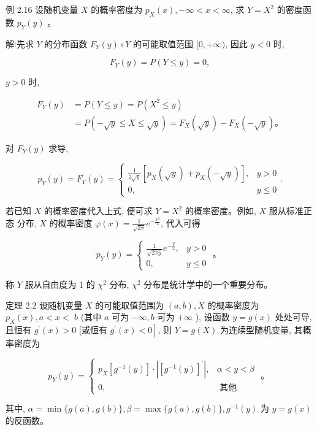 \documentclass{beamer}
\begin{document}
	\begin{frame}
		例 2.16 设随机变量 $X$ 的概率密度为 $p_{X}(x),-\infty<x<\infty$, 求 $Y=X^{2}$ 的密度函数 $p_{Y}(y)$ 。
	\end{frame}
	
	\begin{frame}
		解:先求 $Y$ 的分布函数 $F_{Y}(y) \circ Y$ 的可能取值范围 $[0,+\infty)$, 因此 $y<0$ 时,
		
		$$
		F_{Y}(y)=P(Y \leqslant y)=0,
		$$
		
		$y>0$ 时,
		
		$$
		\begin{aligned}
			F_{Y}(y) & =P(Y \leqslant y)=P\left(X^{2} \leqslant y\right) \\
			& =P(-\sqrt{y} \leqslant X \leqslant \sqrt{y})=F_{X}(\sqrt{y})-F_{X}(-\sqrt{y}) 。
		\end{aligned}
		$$
		
		对 $F_{Y}(y)$ 求导,
		
		$$
		p_{Y}(y)=F_{Y}^{\prime}(y)=\left\{\begin{array}{cc}
			\frac{1}{2 \sqrt{y}}\left[p_{X}(\sqrt{y})+p_{X}(-\sqrt{y})\right], & y>0 \\
			0, & y \leqslant 0
		\end{array} .\right.
		$$
		
		若已知 $X$ 的概率密度代入上式, 便可求 $Y=X^{2}$ 的概率密度。例如, $X$ 服从标准正态 分布, $X$ 的概率密度 $\varphi(x)=\frac{1}{\sqrt{2 \pi}} e^{-\frac{x^{2}}{2}}$, 代入可得
		
	\end{frame}
	
	\begin{frame}
			$$
		p_{Y}(y)=\left\{\begin{array}{cc}
			\frac{1}{\sqrt{2 \pi y}} e^{-\frac{y}{2}}, & y>0 \\
			0, & y \leqslant 0
		\end{array}\right. \text { 。 }
		$$
		
		称 $Y$ 服从自由度为 1 的 $\chi^{2}$ 分布, $\chi^{2}$ 分布是统计学中的一个重要分布。
	\end{frame}
	
	\begin{frame}
		定理 2.2 设随机变量 $X$ 的可能取值范围为 $(a, b), X$ 的概率密度为 $p_{X}(x), a<x<$ $b$ (其中 $a$ 可为 $-\infty, b$ 可为 $+\infty$ ), 设函数 $y=g(x)$ 处处可导, 且恒有 $g^{\prime}(x)>0$ [或恒有 $\left.g^{\prime}(x)<0\right]$, 则 $Y=g(X)$ 为连续型随机变量, 其概率密度为
		
		$$
		p_{Y}(y)=\left\{\begin{array}{cl}
			p_{X}\left[g^{-1}(y)\right] \cdot\left|\left[g^{-1}(y)\right]^{\prime}\right|, & \alpha<y<\beta \\
			0, & \text { 其他 }
		\end{array}\right. \text { 。 }
		$$
		
		其中, $\alpha=\min \{g(a), g(b)\}, \beta=\max \{g(a), g(b)\}, g^{-1}(y)$ 为 $y=g(x)$ 的反函数。
	\end{frame}
	
\end{document}
